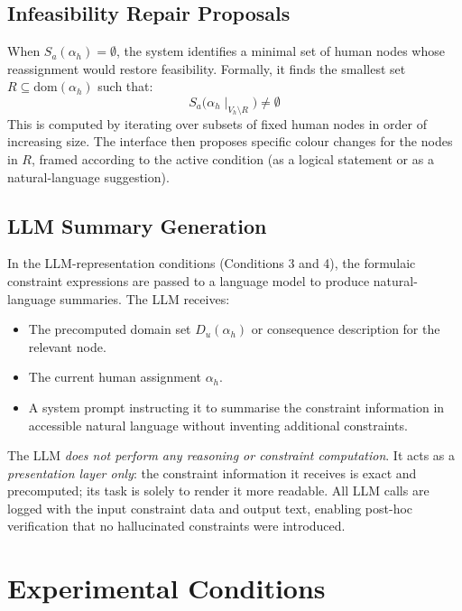 \documentclass[10pt]{article}
\theoremstyle{definition}
\begin{document}
\subsection{Infeasibility Repair Proposals}
\label{sec:feasibility}

When $S_a(\alpha_h) = \emptyset$, the system identifies a minimal set of human nodes whose
reassignment would restore feasibility.  Formally, it finds the smallest set
$R \subseteq \mathrm{dom}(\alpha_h)$ such that:
\[
  S_a\bigl(\alpha_h \mid_{V_h \setminus R}\bigr) \neq \emptyset
\]
This is computed by iterating over subsets of fixed human nodes in order of increasing size.
The interface then proposes specific colour changes for the nodes in $R$, framed according to the
active condition (as a logical statement or as a natural-language suggestion).

\subsection{LLM Summary Generation}
\label{sec:llm}

In the LLM-representation conditions (Conditions 3 and 4), the formulaic constraint expressions
are passed to a language model to produce natural-language summaries.  The LLM receives:
\begin{itemize}
  \item The precomputed domain set $D_u(\alpha_h)$ or consequence description for the relevant node.
  \item The current human assignment $\alpha_h$.
  \item A system prompt instructing it to summarise the constraint information in accessible
        natural language without inventing additional constraints.
\end{itemize}
The LLM \emph{does not perform any reasoning or constraint computation}.  It acts as a
\emph{presentation layer only}: the constraint information it receives is exact and
precomputed; its task is solely to render it more readable.  All LLM calls are logged with the
input constraint data and output text, enabling post-hoc verification that no hallucinated
constraints were introduced.

\section{Experimental Conditions}
\label{sec:conditions}
\end{document}
